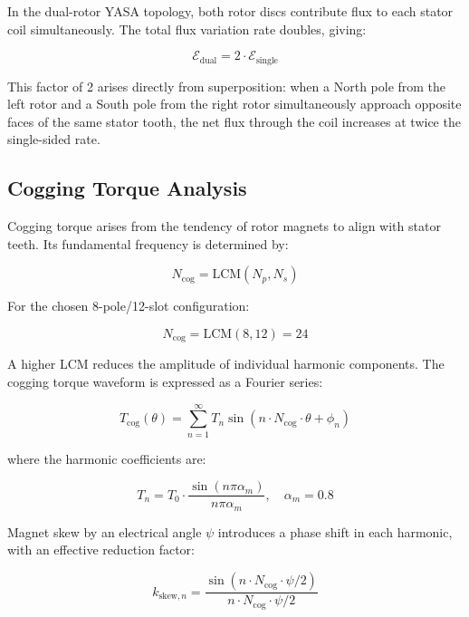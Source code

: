 \documentclass[12pt,a4paper]{article}
\begin{document}
In the dual-rotor YASA topology, both rotor discs contribute flux to each stator coil simultaneously. The total flux variation rate doubles, giving:

\begin{equation}
\mathcal{E}_{\text{dual}} = 2 \cdot \mathcal{E}_{\text{single}}
\label{eq:emf_dual}
\end{equation}

This factor of 2 arises directly from superposition: when a North pole from the left rotor and a South pole from the right rotor simultaneously approach opposite faces of the same stator tooth, the net flux through the coil increases at twice the single-sided rate.

\subsection{Cogging Torque Analysis}
Cogging torque arises from the tendency of rotor magnets to align with stator teeth. Its fundamental frequency is determined by:

\begin{equation}
N_{\text{cog}} = \text{LCM}(N_p, N_s)
\label{eq:ncog}
\end{equation}

For the chosen 8-pole/12-slot configuration:

\begin{equation}
N_{\text{cog}} = \text{LCM}(8, 12) = 24
\end{equation}

A higher LCM reduces the amplitude of individual harmonic components. The cogging torque waveform is expressed as a Fourier series:

\begin{equation}
T_{\text{cog}}(\theta) = \sum_{n=1}^{\infty} T_n \sin\left(n \cdot N_{\text{cog}} \cdot \theta + \phi_n\right)
\label{eq:cogging_fourier}
\end{equation}

where the harmonic coefficients are:

\begin{equation}
T_n = T_0 \cdot \frac{\sin(n\pi\alpha_m)}{n\pi\alpha_m}, \quad \alpha_m = 0.8
\end{equation}

Magnet skew by an electrical angle $\psi$ introduces a phase shift in each harmonic, with an effective reduction factor:

\begin{equation}
k_{\text{skew},n} = \frac{\sin(n \cdot N_{\text{cog}} \cdot \psi / 2)}{n \cdot N_{\text{cog}} \cdot \psi / 2}
\label{eq:skew}
\end{equation}
\end{document}
